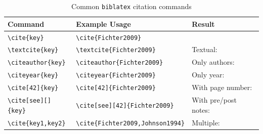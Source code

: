 \begin{table}[H]
    \centering
    \caption{Common \texttt{biblatex} citation commands}
    \label{tbl:citation-commands}
    \begin{tabular}{lll}
        \toprule
        \textbf{Command} & \textbf{Example Usage} & \textbf{Result} \\
        \midrule
        \texttt{\textbackslash cite\{key\}} & \texttt{\textbackslash cite\{Fichter2009\}} & \cite{Fichter2009} \\
        \texttt{\textbackslash textcite\{key\}} & \texttt{\textbackslash textcite\{Fichter2009\}} & Textual: \textcite{Fichter2009} \\
        \texttt{\textbackslash citeauthor\{key\}} & \texttt{\textbackslash citeauthor\{Fichter2009\}} & Only authors: \citeauthor{Fichter2009} \\
        \texttt{\textbackslash citeyear\{key\}} & \texttt{\textbackslash citeyear\{Fichter2009\}} & Only year: \citeyear{Fichter2009} \\
        \texttt{\textbackslash cite[42]\{key\}} & \texttt{\textbackslash cite[42]\{Fichter2009\}} & With page number: \cite[42]{Fichter2009} \\
        \texttt{\textbackslash cite[see][]\{key\}} & \texttt{\textbackslash cite[see][42]\{Fichter2009\}} & With pre/post notes: \cite[see][42]{Fichter2009} \\
        \texttt{\textbackslash cite\{key1,key2\}} & \texttt{\textbackslash cite\{Fichter2009,Johnson1994\}} & Multiple: \cite{Fichter2009,Johnson1994} \\
        \bottomrule
    \end{tabular}
\end{table}
